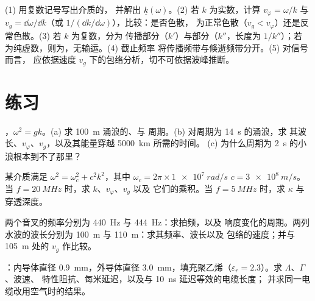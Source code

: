 \begin{method}[读懂色散关系]\label{met:b2:dispersion-wave-packets:method}
(1) 用复数记号写出介质的，
并解出 $\underline k(\omega)$。(2) 若 $k$ 为实数，计算 $v_\varphi = \omega/k$ 与
$v_g = \dd\omega/\dd k$（或 $1/(\dd k/\dd\omega)$），比较：是否色散，
为正常色散（$v_g < v_\varphi$）还是反常色散。(3) 若 $k$ 为复数，分为
传播部分（$k'$）与部分（$k''$，长度为 $1/k''$）；若
为纯虚数，则为，无输运。(4) 截止频率
将传播频带与倏逝频带分开。(5) 对信号而言，
应依据速度 $v_g$ 下的包络分析，切不可依据波峰推断。
\end{method}

\section{练习}

\begin{exercise}[$\star$]\label{exo:b2:dispersion-wave-packets:1}
，$\omega^2 = gk$。(a) 求 \qty{100}{m} 涌浪的、与
周期。(b) 对周期为 \qty{14}{s} 的涌浪，求
其波长、$v_\varphi$、$v_g$，以及其能量穿越 \qty{5000}{km} 所需的时间。
(c) 为什么周期为 \qty{2}{s} 的小浪根本到不了那里？
\end{exercise}

\begin{exercise}[$\star$]\label{exo:b2:dispersion-wave-packets:2}
某介质满足 $\omega^2 = \omega_c^2 + c^2k^2$，其中 $\omega_c = 2\pi \times \qty{1e7}{rad/s}$
$c = \qty{3e8}{m/s}$。当 $f = \qty{20}{MHz}$ 时，求 $k$、$v_\varphi$、$v_g$ 以及
它们的乘积。当 $f = \qty{5}{MHz}$ 时，求 $\kappa$ 与穿透深度。
\end{exercise}

\begin{exercise}[$\star$]\label{exo:b2:dispersion-wave-packets:3}
两个音叉的频率分别为 \qty{440}{Hz} 与 \qty{444}{Hz}：求拍频，以及
响度变化的周期。两列水波的波长分别为
\qty{100}{m} 与 \qty{110}{m}：求其频率、波长以及
包络的速度；并与 \qty{105}{m} 处的 $v_g$ 作比较。
\end{exercise}

\begin{exercise}[$\star$]\label{exo:b2:dispersion-wave-packets:4}
：内导体直径 \qty{0.9}{mm}，外导体直径
\qty{3.0}{mm}，填充聚乙烯（$\varepsilon_r = 2.3$）。求 $\Lambda$、$\Gamma$、波速、
特性阻抗、每米延迟，以及与 \qty{10}{ns} 延迟等效的电缆长度；
并求同一电缆改用空气时的结果。
\end{exercise}

